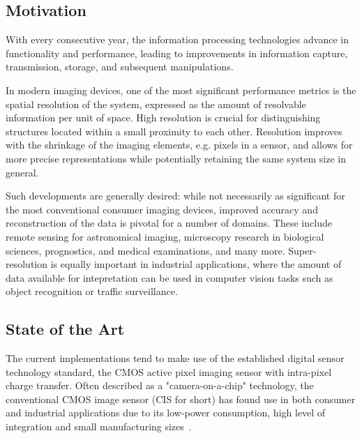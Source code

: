 
\subsection{Motivation}
\label{chapter:motivation}

With every consecutive year, the information processing technologies advance in functionality and performance, leading to improvements in information capture, transmission, storage, and subsequent manipulations. 

In modern imaging devices, one of the most significant performance metrics is the spatial resolution of the system, expressed as the amount of resolvable information per unit of space. High resolution is crucial for distinguishing structures located within a small proximity to each other. Resolution improves with the shrinkage of the imaging elements, e.g. pixels in a sensor, and allows for more precise representations while potentially retaining the same system size in general. 

Such developments are generally desired: while not necessarily as significant for the most conventional consumer imaging devices, improved accuracy and reconstruction of the data is pivotal for a number of domains. These include remote sensing for astronomical imaging, microscopy research in biological sciences, prognostics, and medical examinations, and many more. Super-resolution is equally important in industrial applications, where the amount of data available for intepretation can be used in computer vision tasks such as object recognition or traffic surveillance.%
\cite{SResolution, Anwar2020ADJ}  

\subsection{State of the Art}
The current implementations tend to make use of the established digital sensor technology standard, the CMOS active pixel imaging sensor with intra-pixel charge transfer. Often described as a "camera-on-a-chip" technology, the conventional CMOS image sensor (CIS for short) has found use in both consumer and industrial applications due to its low-power consumption, high level of integration and small manufacturing sizes~\cite{8454568}. 

